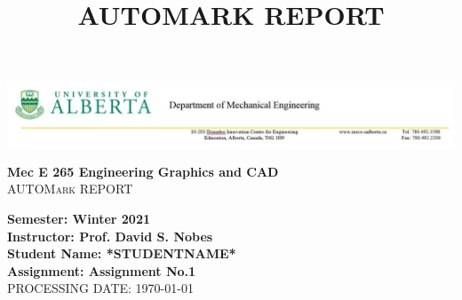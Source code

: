 \documentclass{article}
\title{AUTOMARK REPORT}
\date{}
\begin{document}
	
\begin{center}
\includegraphics[scale=0.5]{./IncludeImages/LetterHead.jpg}
\end{center}

\begin{center}
\textbf{\huge  Mec E 265 Engineering Graphics and CAD}\\[1cm] %
\textsc{\LARGE AUTOMark REPORT}\\[0.5cm] %
\end{center}
 \bigskip
\linespread{1.5} %
\begin{flushleft} \large
\textbf{Semester: Winter 2021}\\
\textbf{Instructor: Prof. David S. Nobes}\\
\textbf{Student Name: *STUDENTNAME*}\\
\textbf{Assignment: Assignment No.1}\\ 
PROCESSING DATE: {\large \today}\\[0.5cm] %
\end{flushleft}
%
\end{document}
